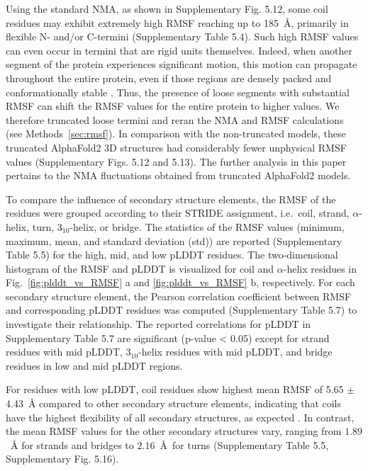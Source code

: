 Using the standard NMA, as shown in Supplementary Fig. 5.12,
some coil residues may exhibit extremely high RMSF reaching up to 185~\AA, primarily in flexible N- and/or C-termini (Supplementary Table 5.4).
Such high RMSF values can even occur in termini that are rigid units themselves. Indeed, when another segment of the protein experiences significant motion, this motion can propagate throughout the entire protein, even if those regions are densely packed and conformationally stable \cite{bahar2010normal}. Thus, the presence of loose segments with substantial RMSF can shift the RMSF values for the entire protein to higher values. We therefore truncated loose termini and reran the NMA and RMSF calculations (see Methods~\ref{sec:rmsf}). In comparison with the non-truncated models, these truncated AlphaFold2 3D structures had considerably fewer unphysical RMSF values (Supplementary Figs. 5.12 and 5.13).
The further analysis in this paper pertains to the NMA fluctuations obtained from truncated AlphaFold2 models. 


To compare the influence of secondary structure elements, the RMSF of the residues were grouped according to their STRIDE assignment, i.e.\ coil, strand, $\alpha$-helix, turn, $3_{10}$-helix, or bridge. The statistics of the RMSF values (minimum, maximum, mean, and standard deviation (std)) are reported (Supplementary Table 5.5)
for the high, mid, and low pLDDT residues. The two-dimensional histogram of the RMSF and pLDDT is visualized for coil and $\alpha$-helix residues in Fig.~\ref{fig:plddt_vs_RMSF} a and \ref{fig:plddt_vs_RMSF} b, respectively.
For each secondary structure element, the Pearson correlation coefficient between RMSF and corresponding pLDDT residues was computed (Supplementary Table 5.7)
to investigate their relationship. The reported correlations for pLDDT in Supplementary Table 5.7
are significant (p-value < 0.05) except for strand residues with mid pLDDT, $3_{10}$-helix residues with mid pLDDT, and bridge residues in low and mid pLDDT regions. 

For residues with low pLDDT, coil residues show highest mean RMSF of 5.65 $\pm$ 4.43~{\AA} compared to other secondary structure elements, indicating that coils have the highest flexibility of all secondary structures, as expected \cite{saldano_impact_2022}. In contrast, the mean RMSF values for the other secondary structures vary, ranging from $1.89$~{\AA} for strands and bridges to $2.16$~\AA~for turns (Supplementary Table 5.5, Supplementary Fig. 5.16).


